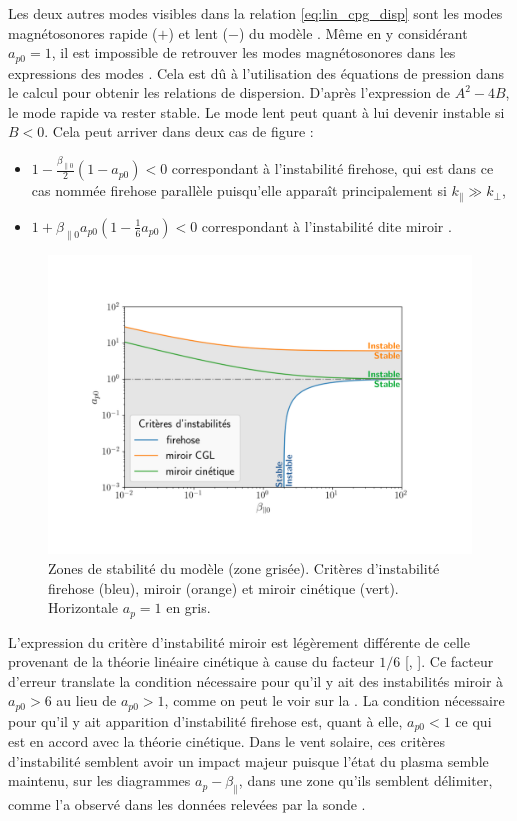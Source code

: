 Les deux autres modes visibles dans la relation \eqref{eq:lin_cpg_disp} sont les modes magnétosonores rapide ($+$) et lent ($-$) du modèle . Même en y considérant $a_{p0}=1$, il est impossible de retrouver les modes magnétosonores  dans les expressions des modes . Cela est dû à l'utilisation des équations de pression dans le calcul pour obtenir les relations de dispersion. D'après l'expression de $A^2 -4B$, le mode rapide va rester stable. Le mode lent peut quant à lui devenir instable si $B < 0 $. Cela peut arriver dans deux cas de figure : 
\begin{itemize}
    \item $1-\frac{\beta_{\parallel 0}}{2} \left(1-a_{p0}\right)<0$ correspondant à l'instabilité firehose, qui est dans ce cas nommée firehose parallèle puisqu'elle apparaît principalement si $k_{\parallel}\gg k_{\perp}$, 
    \item $1+\beta_{\parallel 0}a_{p0}\left(1-\frac{1}{6}a_{p0}\right)<0$ correspondant à l'instabilité dite \og miroir \fg{}. 
\end{itemize}
\begin{figure}[!ht]
 \centering
 \includegraphics[width=0.9\linewidth,trim=3cm 2cm 4cm 3cm, clip=true]{./Mainmatter/Part_2/images/crit_diag_CGL}
\cprotect\caption{Zones de stabilité du modèle  (zone grisée). Critères d'instabilité firehose (bleu), miroir (orange) et miroir cinétique (vert). Horizontale \ensuremath{a_p=1} en gris.}
\label{fig:diag_cgl}
 \end{figure}
L'expression du critère d'instabilité miroir est légèrement différente de celle provenant de la théorie linéaire cinétique à cause du facteur $1/6$ [\cite{galeev_mhd_1983}, \cite{ferriere_mixed_2002}]. Ce facteur d'erreur translate la condition nécessaire pour qu'il y ait des instabilités miroir à $a_{p0}>6$ au lieu de $a_{p0}>1$, comme on peut le voir sur la . La condition nécessaire pour qu'il y ait apparition d'instabilité firehose est, quant à elle, $a_{p0}<1$ ce qui est en accord avec la théorie cinétique. Dans le vent solaire, ces critères d'instabilité semblent avoir un impact majeur puisque l'état du plasma semble maintenu, sur les diagrammes $a_p-\beta_{\parallel}$, dans une zone qu'ils semblent délimiter, comme l'a observé \cite{hellinger_solar_2006} dans les données relevées par la sonde . 

